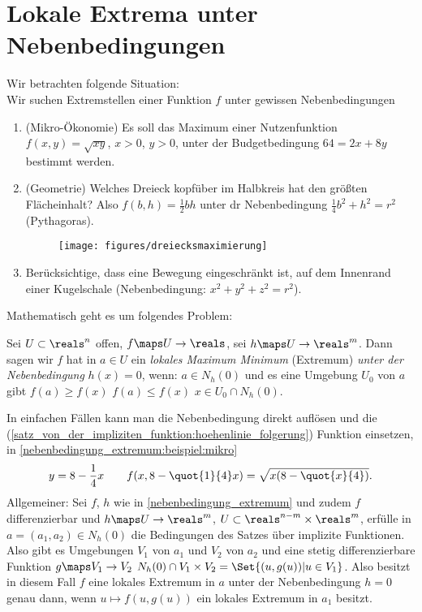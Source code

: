 \section{Lokale Extrema unter Nebenbedingungen}
Wir betrachten folgende Situation:\\
Wir suchen Extremstellen einer Funktion \( f \) unter gewissen Nebenbedingungen \zb 
\begin{enumerate}[label=\rechtsklammer{\alph*}]
  \item\label{nebenbedingung_extremum:beispiel:mikro} (Mikro-Ökonomie) Es soll das Maximum einer Nutzenfunktion \( f(x,y)=\sqrt{xy} \), \( x>0 \), \( y>0 \), unter der Budgetbedingung \( 64=2x+8y \) bestimmt werden.
  \item\label{nebenbedingung_extremum:beispiel:geometrie} (Geometrie) Welches Dreieck kopfüber im Halbkreis hat den größten Flächeinhalt? Also \( f(b,h)=\frac{1}{2}bh \) unter dr Nebenbedingung \( \frac{1}{4}b^2+h^2=r^2 \) (Pythagoras).
  \begin{figure}[H]
    \centering
    \texttt{[image: figures/dreiecksmaximierung]}
    \label{fig:dreiecksmaximierung}
  \end{figure}
  \item Berücksichtige, dass eine Bewegung eingeschränkt ist, \zb auf dem Innenrand einer Kugelschale (Nebenbedingung: \( x^2+y^2+z^2=r^2 \)).
\end{enumerate}
Mathematisch geht es um folgendes Problem:
\begin{definition}\label{nebenbedingung_extremum}
  Sei \( U\subset \reals^n \) offen, \( f\maps U\to \reals \), sei \( h\maps U\to \reals^m \). Dann sagen wir \( f \) hat in \( a\in U \) ein \emph{lokales Maximum \bzw Minimum} (Extremum) \emph{unter der Nebenbedingung} \( h(x)=0 \), wenn: \( a\in N_h(0) \) und es eine Umgebung \( U_0 \) von \( a \) gibt \sd \( f(a)\geq f(x) \) \bzw \( f(a)\leq f(x) \) \tforall \( x\in U_0 \cap N_h(0) \).
\end{definition}
In einfachen Fällen kann man die Nebenbedingung direkt auflösen und die (\ref{satz_von_der_impliziten_funktion:hoehenlinie_folgerung}) Funktion einsetzen, \zb in \ref{nebenbedingung_extremum:beispiel:mikro}
\begin{equation*}
  y=8-\frac{1}{4}x\qquad f(x,8-\quot{1}{4}x)=\sqrt{x(8-\quot{x}{4})}.
\end{equation*}
Allgemeiner: Sei \( f \), \( h \) wie in \ref{nebenbedingung_extremum} und zudem \( f \) differenzierbar und \( h\maps U\to \reals^m \), \( U\subset \reals^{n-m}\times \reals^m \), erfülle in \( a=(a_1,a_2)\in N_h(0) \) die Bedingungen des Satzes über implizite Funktionen. Also gibt es Umgebungen \( V_1 \) von \( a_1 \) und \( V_2 \) von \( a_2 \) und eine stetig differenzierbare Funktion \( g\maps V_1\to V_2 \) \sd \( N_h(0)\cap V_1\times V_2=\Set{(u,g(u))|u\in V_1} \). Also besitzt in diesem Fall \( f \) eine lokales Extremum in \( a \) unter der Nebenbedingung \( h=0 \) genau dann, wenn \( u\mapsto f(u,g(u)) \) ein lokales Extremum in \( a_1 \) besitzt.

